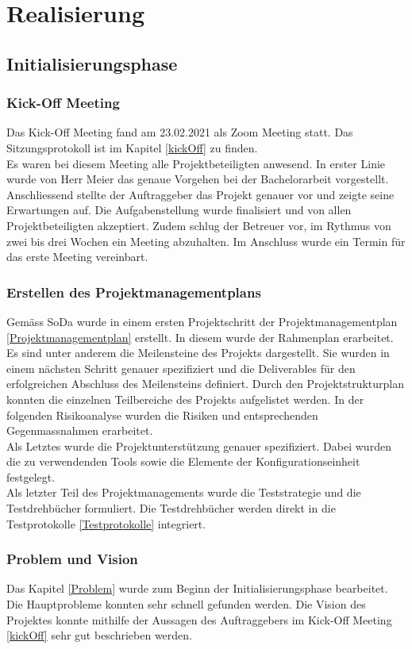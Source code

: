 \section{Realisierung}\label{realisierung}
\subsection{Initialisierungsphase}
\subsubsection{Kick-Off Meeting}
Das Kick-Off Meeting fand am 23.02.2021 als Zoom Meeting statt. Das Sitzungsprotokoll ist im Kapitel \ref{kickOff} zu finden. \\
Es waren bei diesem Meeting alle Projektbeteiligten anwesend. In erster Linie wurde von Herr Meier das genaue Vorgehen bei der Bachelorarbeit vorgestellt. Anschliessend stellte der Auftraggeber das Projekt genauer vor und zeigte seine Erwartungen auf. Die Aufgabenstellung wurde finalisiert und von allen Projektbeteiligten akzeptiert. Zudem schlug der Betreuer vor, im Rythmus von zwei bis drei Wochen ein Meeting abzuhalten. Im Anschluss wurde ein Termin für das erste Meeting vereinbart. 
\subsubsection{Erstellen des Projektmanagementplans}
Gemäss \gls{SoDa} wurde in einem ersten Projektschritt der Projektmanagementplan \ref{Projektmanagementplan} erstellt. In diesem wurde der Rahmenplan erarbeitet. Es sind unter anderem die Meilensteine des Projekts dargestellt. Sie wurden in einem nächsten Schritt genauer spezifiziert und die Deliverables für den erfolgreichen Abschluss des Meilensteins definiert. Durch den Projektstrukturplan konnten die einzelnen Teilbereiche des Projekts aufgelistet werden.
In der folgenden Risikoanalyse wurden die Risiken und entsprechenden Gegenmassnahmen erarbeitet. \\
Als Letztes wurde die Projektunterstützung genauer spezifiziert. Dabei wurden die zu verwendenden Tools sowie die Elemente der Konfigurationseinheit festgelegt. \\
Als letzter Teil des Projektmanagements wurde die Teststrategie und die Testdrehbücher formuliert. Die Testdrehbücher werden direkt in die Testprotokolle \ref{Testprotokolle} integriert. 

\subsubsection{Problem und Vision}
Das Kapitel \ref{Problem} wurde zum Beginn der Initialisierungsphase bearbeitet. Die Hauptprobleme konnten sehr schnell gefunden werden. Die Vision des Projektes konnte mithilfe der Aussagen des Auftraggebers im Kick-Off Meeting \ref{kickOff} sehr gut beschrieben werden. 
